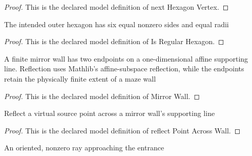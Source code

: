 \begin{proof}
  This is the declared model definition of next Hexagon Vertex.
\end{proof}
\begin{definition}
  \label{def:physics:phyx-mini-0164:phyxminiproblems-problemphyxmini0164-isregularhexagon}
  The intended outer hexagon has six equal nonzero sides and equal radii
\end{definition}
\begin{proof}
  This is the declared model definition of Is Regular Hexagon.
\end{proof}
\begin{definition}
  \label{def:physics:phyx-mini-0164:phyxminiproblems-problemphyxmini0164-mirrorwall}
  A finite mirror wall has two endpoints on a one-dimensional affine supporting line. Reflection uses Mathlib's affine-subspace reflection, while the endpoints retain the physically finite extent of a maze wall
\end{definition}
\begin{proof}
  This is the declared model definition of Mirror Wall.
\end{proof}
\begin{definition}
  \label{def:physics:phyx-mini-0164:phyxminiproblems-problemphyxmini0164-reflectpointacrosswall}
  Reflect a virtual source point across a mirror wall's supporting line
\end{definition}
\begin{proof}
  This is the declared model definition of reflect Point Across Wall.
\end{proof}
\begin{definition}
  \label{def:physics:phyx-mini-0164:phyxminiproblems-problemphyxmini0164-entranceray}
  An oriented, nonzero ray approaching the entrance
\end{definition}
